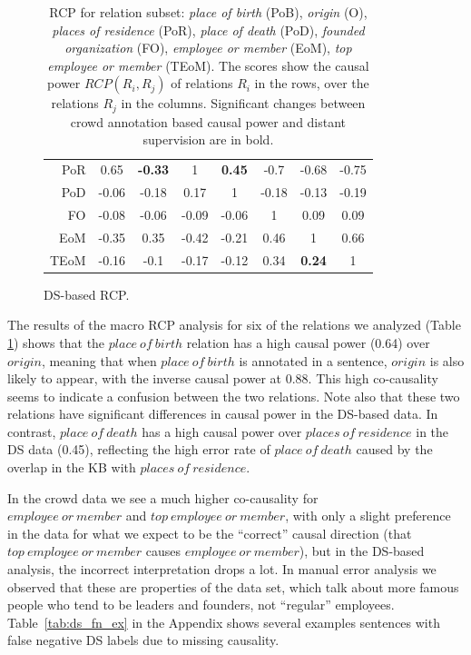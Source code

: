 \begin{table}[htb!]
\begin{subfigure}{\textwidth}
{\begin{tabular}{rccccccc}
     PoR   & 0.65  & \textbf{-0.33} & 1     & \textbf{0.45}  & -0.7  & -0.68 & -0.75 \\  
     \cellcolor{aliceblue}PoD   & \cellcolor{aliceblue}-0.06 & \cellcolor{aliceblue}-0.18 & \cellcolor{aliceblue}0.17  & \cellcolor{aliceblue}1     & \cellcolor{aliceblue}-0.18 & \cellcolor{aliceblue}-0.13 & \cellcolor{aliceblue}-0.19 \\ 
     FO    & -0.08 & -0.06 & -0.09 & -0.06 & 1     & 0.09  & 0.09 \\ 
     \cellcolor{aliceblue}EoM   & \cellcolor{aliceblue}-0.35 & \cellcolor{aliceblue}0.35  & \cellcolor{aliceblue}-0.42 & \cellcolor{aliceblue}-0.21 & \cellcolor{aliceblue}0.46  & \cellcolor{aliceblue}1     & \cellcolor{aliceblue}0.66 \\ 
     TEoM  & -0.16 & -0.1  & -0.17 & -0.12 & 0.34  & \textbf{0.24}  & 1 \\ \bottomrule
    \end{tabular}
    }
	\caption{DS-based RCP.}
    \label{tab:ds_rcp}
\end{subfigure}
\caption{RCP for relation subset: \textit{place of birth} (PoB), \textit{origin} (O), \textit{places of residence} (PoR), \textit{place of death} (PoD), \textit{founded organization} (FO), \textit{employee or member} (EoM), \textit{top employee or member} (TEoM). The scores show the causal power $RCP(R_i, R_j)$ of relations $R_i$ in the rows, over the relations $R_j$ in the columns. Significant changes between crowd annotation based causal power and distant supervision are in bold.}
\label{tab:rcp}
\end{table}

The results of the macro RCP analysis for six of the relations we analyzed (Table \ref{tab:rcp}) shows that the $place\ of\ birth$ relation has a high causal power (0.64) over $origin$, meaning that when $place\ of\ birth$ is annotated in a sentence, $origin$ is also likely to appear, with the inverse causal power at 0.88.  This high co-causality seems to indicate a confusion between the two relations. Note also that these two relations have significant differences in causal power in the DS-based data. In contrast, $place\ of\ death$ has a high causal power over $places\ of\ residence$ in the DS data (0.45), reflecting the high error rate of $place\ of\ death$ caused by the overlap in the KB with $places\ of\ residence$.

In the crowd data we see a much higher co-causality for \\ $employee\ or\ member$ and $top\ employee\ or\ member$, with only a slight preference in the data for what we expect to be the ``correct'' causal direction (that $top\ employee\ or\ member$ causes $employee\ or\ member$), but in the DS-based analysis, the incorrect interpretation drops a lot. In manual error analysis we observed that these are properties of the data set, which talk about more famous people who tend to be leaders and founders, not ``regular'' employees.  Table~\ref{tab:ds_fn_ex} in the Appendix shows several examples sentences with false negative DS labels due to missing causality.

